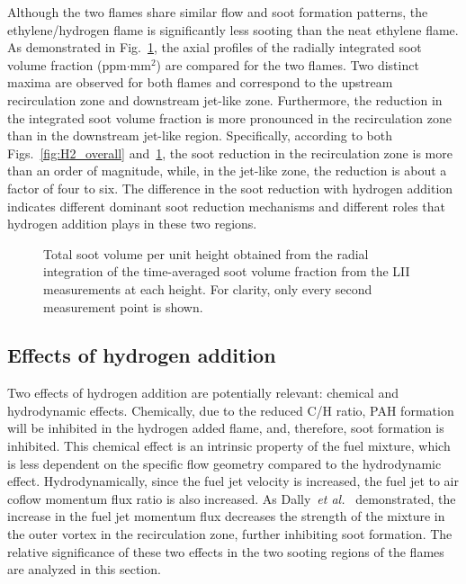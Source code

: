 \documentclass[review,3p,times]{elsarticle}
\begin{document}
Although the two flames share similar flow and soot formation patterns, the ethylene/hydrogen flame is significantly less sooting than the neat ethylene flame.  As demonstrated in Fig.~\ref{fig:ifv}, the axial profiles of the radially integrated soot volume fraction (ppm$\cdot$mm$^2$) are compared for the two flames.  Two distinct maxima are observed for both flames and correspond to the upstream recirculation zone and downstream jet-like zone.  Furthermore, the reduction in the integrated soot volume fraction is more pronounced in the recirculation zone than in the downstream jet-like region.  Specifically, according to both Figs.~\ref{fig:H2_overall} and~\ref{fig:ifv}, the soot reduction in the recirculation zone is more than an order of magnitude, while, in the jet-like zone, the reduction is about a factor of four to six.  The difference in the soot reduction with hydrogen addition indicates different \textcolor{Rv1}{dominant} soot reduction mechanisms and different roles that hydrogen addition plays in these two regions.  

\begin{figure}[t]
  \centering
  \scriptsize
  \vspace{-0.10in}
  \resizebox{0.5\textwidth}{!}{}
  \normalsize
  \vspace{-0.3in}
  \caption{Total soot volume per unit height obtained from the radial integration of the time-averaged soot volume fraction from the LII measurements at each height.  For clarity, only every second measurement point is shown.}
  \label{fig:ifv}
\end{figure}


\subsection{Effects of hydrogen addition}

Two effects of hydrogen addition are potentially relevant: chemical and hydrodynamic effects.  Chemically, due to the reduced C/H ratio, PAH formation will be inhibited in the hydrogen added flame, and, therefore, soot formation is inhibited.  \textcolor{Rv1}{This chemical effect is an intrinsic property of the fuel mixture, which is less dependent on the specific flow geometry compared to the hydrodynamic effect.  }Hydrodynamically, since the fuel jet velocity is increased, the fuel jet to air coflow momentum flux ratio is also increased.  As Dally~\emph{et al.}~\cite{dally98b} demonstrated, the increase in the fuel jet momentum flux decreases the strength of the mixture in the outer vortex in the recirculation zone, further inhibiting soot formation.  The relative significance of these two effects in the two sooting regions of the flames are analyzed in this section.
\end{document}
